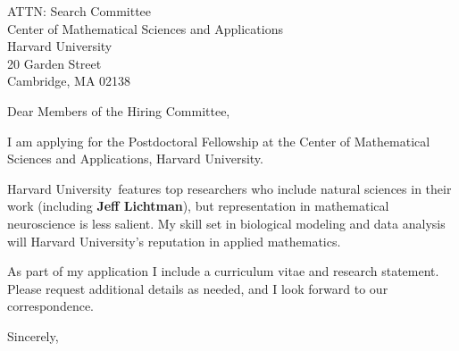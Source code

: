 \documentclass[11pt,a4paper]{letter}
\begin{document}

\def\School{Harvard University}

\begin{letter}
{ATTN: Search Committee\\
Center of Mathematical Sciences and Applications\\
Harvard University\\
20 Garden Street\\
Cambridge, MA 02138}


\opening{Dear Members of the Hiring Committee,}

I am applying for the Postdoctoral Fellowship at the Center of Mathematical Sciences and Applications, \School. 



\School~features top researchers who include natural sciences in their work (including \textbf{Jeff Lichtman}), but representation in mathematical neuroscience is less salient. My skill set in biological modeling and data analysis will  \School's reputation in applied mathematics.

As part of my application I include a curriculum vitae and research statement. Please request additional details as needed, and I look forward to our correspondence.

\closing{Sincerely,}
\end{letter}
\end{document}
